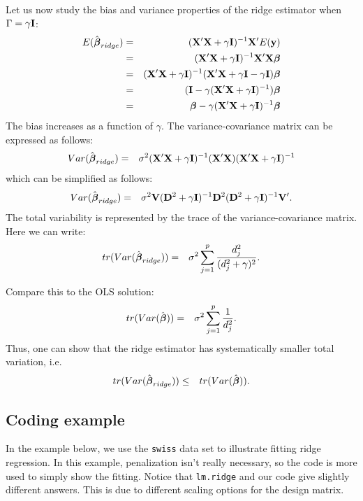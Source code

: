 Let us now study the bias and variance properties of the ridge estimator when $\Gamma = \gamma \mathbf{I}$:
\begin{eqnarray*}
E(\hat {\mbox{\boldmath $\beta$}}_{ridge}) 
& = & ({\mathbf{X}' \mathbf{X}} + \gamma \mathbf{I})^{-1} \mathbf{X}' E(\mathbf{y}) \\
& = & ({\mathbf{X}' \mathbf{X}} + \gamma \mathbf{I})^{-1} \mathbf{X}' \mathbf{X} \mbox{\boldmath $\beta$} \\
& = & ({\mathbf{X}' \mathbf{X}} + \gamma \mathbf{I})^{-1} (\mathbf{X}' \mathbf{X} + \gamma \mathbf{I} - \gamma \mathbf{I}) \mbox{\boldmath $\beta$} \\
& = & (\mathbf{I} - \gamma(\mathbf{X}' \mathbf{X} + \gamma \mathbf{I})^{-1}) \mbox{\boldmath $\beta$} \\
& = & \mbox{\boldmath $\beta$} - \gamma(\mathbf{X}' \mathbf{X} + \gamma \mathbf{I})^{-1} \mbox{\boldmath $\beta$} 
\end{eqnarray*}
The bias increases as a function of $\gamma$.
The variance-covariance matrix can be expressed as follows:
\begin{eqnarray*}
Var(\hat {\mbox{\boldmath $\beta$}}_{ridge}) 
& = & \sigma^2 ({\mathbf{X}' \mathbf{X}} + \gamma \mathbf{I})^{-1} ({\mathbf{X}' \mathbf{X}}) ({\mathbf{X}' \mathbf{X}} + \gamma \mathbf{I})^{-1}
\end{eqnarray*}
which can be simplified as follows:
\begin{eqnarray*}
Var(\hat {\mbox{\boldmath $\beta$}}_{ridge}) 
& = & \sigma^2 \mathbf{V} (\mathbf{D}^2 + \gamma \mathbf{I})^{-1} {\mathbf{D}}^2 ({\mathbf{D}}^2 + \gamma \mathbf{I})^{-1} \mathbf{V}'.
\end{eqnarray*}
The total variability is represented by the trace of the variance-covariance matrix. 
Here we can write:
\begin{eqnarray*}
tr(Var(\hat {\mbox{\boldmath $\beta$}}_{ridge}))  &=& \sigma^2 \sum_{j=1}^p \frac{d_j^2}{(d_j^2 + \gamma)^2}.
\end{eqnarray*}

Compare this to the OLS solution:
\begin{eqnarray*}
tr(Var(\hat {\mbox{\boldmath $\beta$}}))  &=& \sigma^2 \sum_{j=1}^p \frac{1}{d_j^2}.
\end{eqnarray*}
Thus, one can show that the ridge estimator has systematically smaller total variation, i.e.
\begin{eqnarray*}
tr(Var(\hat {\mbox{\boldmath $\beta$}}_{ridge}))  & \leq & tr(Var(\hat {\mbox{\boldmath $\beta$}})).
\end{eqnarray*}




\subsection{Coding example}

In the example below, we use the \texttt{swiss} data set to illustrate
fitting ridge regression. In this example, penalization isn't really
necessary, so the code is more used to simply show the fitting.
Notice that \texttt{lm.ridge} and our code give slightly different
answers. This is due to different scaling options for the design matrix.

